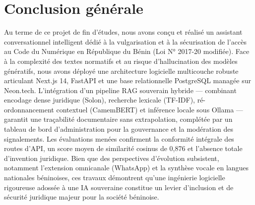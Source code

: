 \chapter*{Conclusion générale}

Au terme de ce projet de fin d'études, nous avons conçu et réalisé un assistant conversationnel intelligent dédié à la vulgarisation et à la sécurisation de l'accès au Code du Numérique en République du Bénin (Loi N° 2017-20 modifiée). Face à la complexité des textes normatifs et au risque d'hallucination des modèles génératifs, nous avons déployé une architecture logicielle multicouche robuste articulant Next.js 14, FastAPI et une base relationnelle PostgreSQL managée sur Neon.tech. L'intégration d'un pipeline RAG souverain hybride — combinant encodage dense juridique (Solon), recherche lexicale (TF-IDF), ré-ordonnancement contextuel (CamemBERT) et inférence locale sous Ollama — garantit une traçabilité documentaire sans extrapolation, complétée par un tableau de bord d'administration pour la gouvernance et la modération des signalements. Les évaluations menées confirment la conformité intégrale des routes d'API, un score moyen de similarité cosinus de 0,876 et l'absence totale d'invention juridique. Bien que des perspectives d'évolution subsistent, notamment l'extension omnicanale (WhatsApp) et la synthèse vocale en langues nationales béninoises, ces travaux démontrent qu'une ingénierie logicielle rigoureuse adossée à une IA souveraine constitue un levier d'inclusion et de sécurité juridique majeur pour la société béninoise.